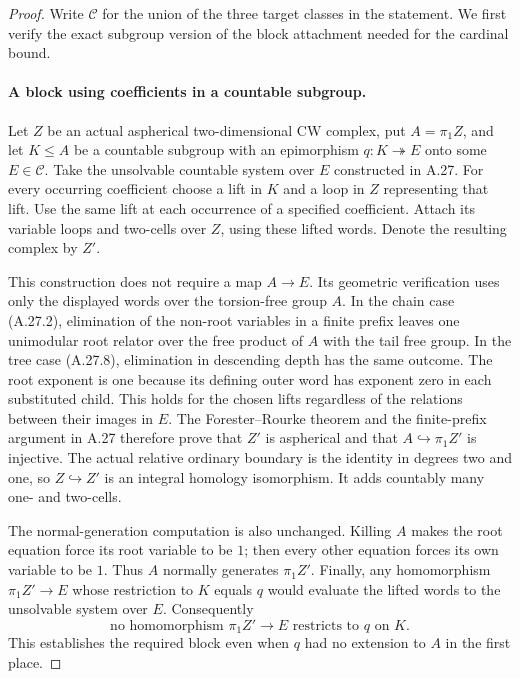 \begin{proof}
Write $\mathcal C$ for the union of the three target
classes in the statement. We first verify the exact
subgroup version of the block attachment needed for
the cardinal bound.

\paragraph{A block using coefficients in a countable subgroup.}
Let $Z$ be an actual aspherical two-dimensional CW
complex, put $A=\pi_1Z$, and let $K\leq A$ be a
countable subgroup with an epimorphism $q:K\twoheadrightarrow E$
onto some $E\in\mathcal C$. Take the unsolvable
countable system over $E$ constructed in A.27. For
every occurring coefficient choose a lift in $K$ and
a loop in $Z$ representing that lift. Use the same
lift at each occurrence of a specified coefficient.
Attach its variable loops and two-cells over $Z$,
using these lifted words. Denote the resulting complex
by $Z'$.

This construction does not require a map $A\to E$.
Its geometric verification uses only the displayed
words over the torsion-free group $A$. In the chain
case (A.27.2), elimination of the non-root variables
in a finite prefix leaves one unimodular root relator
over the free product of $A$ with the tail free group.
In the tree case (A.27.8), elimination in descending
depth has the same outcome. The root exponent is
one because its defining outer word has exponent
zero in each substituted child. This holds for the
chosen lifts regardless of the relations between
their images in $E$. The Forester--Rourke theorem
and the finite-prefix argument in A.27 therefore
prove that $Z'$ is aspherical and that
$A\hookrightarrow\pi_1Z'$ is injective. The actual
relative ordinary boundary is the identity in
degrees two and one, so $Z\hookrightarrow Z'$ is
an integral homology isomorphism. It adds countably
many one- and two-cells.

The normal-generation computation is also unchanged.
Killing $A$ makes the root equation force its root
variable to be $1$; then every other equation forces
its own variable to be $1$. Thus $A$ normally
generates $\pi_1Z'$. Finally, any homomorphism
$\pi_1Z'\to E$ whose restriction to $K$ equals $q$
would evaluate the lifted words to the unsolvable
system over $E$. Consequently
\[
 \text{no homomorphism }\pi_1Z'\longrightarrow E
 \text{ restricts to }q\text{ on }K.
 \tag{A.28.2}
\]
This establishes the required block even when $q$
had no extension to $A$ in the first place.


\end{proof}
